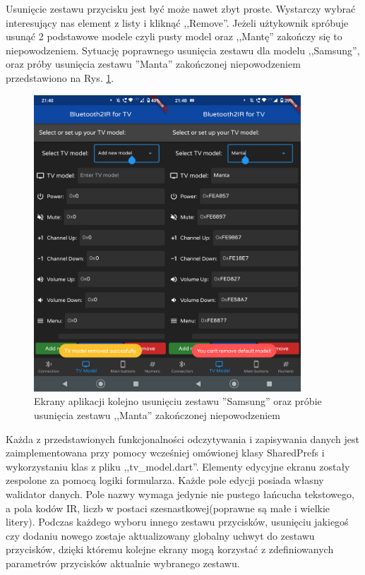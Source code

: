 \documentclass[12pt,twoside,draft]{article}
\begin{document}
Usunięcie zestawu przycisku jest być może nawet zbyt proste. Wystarczy wybrać interesujący nas element z listy i kliknąć ,,Remove''. Jeżeli użtykownik spróbuje usunąć 2 podstawowe modele czyli pusty model oraz ,,Mantę'' zakończy się to niepowodzeniem. Sytuację poprawnego usunięcia zestawu dla modelu ,,Samsung'', oraz próby usunięcia zestawu ''Manta'' zakończonej niepowodzeniem przedstawiono na Rys. \ref*{Fig:removingSamsung}.

\begin{figure}[ht]
   \centering
   \includegraphics[width=10cm]{images/removingSamsung.png}
   \caption{Ekrany aplikacji kolejno usunięciu zestawu ''Samsung'' oraz próbie usunięcia zestawu ,,Manta'' zakończonej niepowodzeniem}
   \label{Fig:removingSamsung}
\end{figure}

Każda z przedstawionych funkcjonalności odczytywania i zapisywania danych jest zaimplementowana przy pomocy wcześniej omówionej klasy SharedPrefs i wykorzystaniu klas z pliku ,,tv\_model.dart''. Elementy edycyjne ekranu zostały zespolone za pomocą logiki formularza. Każde pole edycji posiada własny walidator danych. Pole nazwy wymaga jedynie nie pustego łańcucha tekstowego, a pola kodów IR, liczb w postaci szesnastkowej(poprawne są małe i wielkie litery). Podczas każdego wyboru innego zestawu przycisków, usunięciu jakiegoś czy dodaniu nowego zostaje aktualizowany globalny uchwyt do zestawu przycisków, dzięki któremu kolejne ekrany mogą korzystać z zdefiniowanych parametrów przycisków aktualnie wybranego zestawu.
\end{document}
